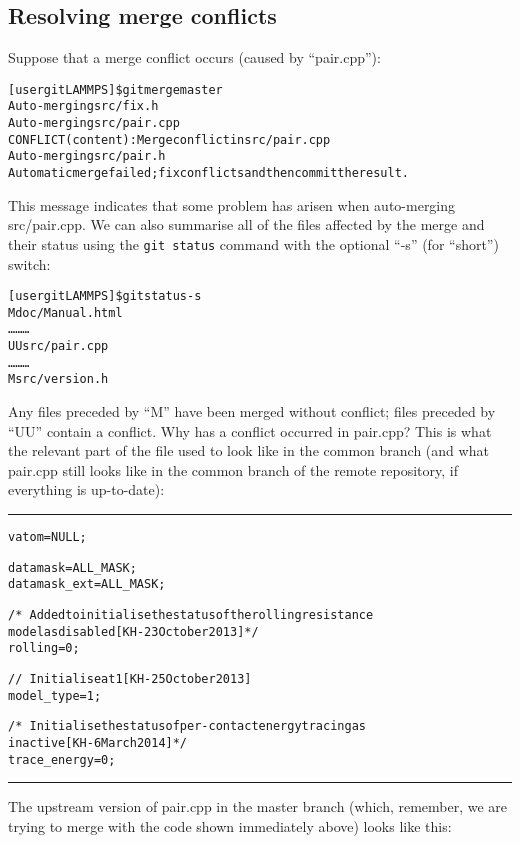 \documentclass[a4paper,oneside,11pt]{article}
\begin{document}
\subsection{Resolving merge conflicts}\label{ssec:rmc}
Suppose that a merge conflict occurs (caused by ``pair.cpp''):
\begin{alltt}
[user gitLAMMPS]\$ git merge master
Auto-merging src/fix.h
Auto-merging src/pair.cpp
CONFLICT (content): Merge conflict in src/pair.cpp
Auto-merging src/pair.h
Automatic merge failed; fix conflicts and then commit the result.
\end{alltt}
This message indicates that some problem has arisen when auto-merging src/pair.cpp. We can also summarise all of the files affected by the merge and their status using the \texttt{git status} command with the optional ``-s'' (for ``short'') switch:
\begin{alltt}
[user gitLAMMPS]\$ git status -s
M  doc/Manual.html
\ldots\hspace*{10em}\ldots\hspace*{10em}\ldots
UU src/pair.cpp
\ldots\hspace*{10em}\ldots\hspace*{10em}\ldots
M  src/version.h
\end{alltt}
Any files preceded by ``M'' have been merged without conflict; files preceded by ``UU'' contain a conflict. Why has a conflict occurred in pair.cpp? This is what the relevant part of the file used to look like in the common branch (and what pair.cpp still looks like in the common branch of the remote repository, if everything is up-to-date):

\noindent\textcolor{customblue}{\rule{8cm}{0.8pt}}
\begin{alltt}
  vatom = NULL;

  datamask = ALL_MASK;
  datamask_ext = ALL_MASK;

  /*~ Added to initialise the status of the rolling resistance
    model as disabled [KH - 23 October 2013]*/
  rolling = 0;

  //~ Initialise at 1 [KH - 25 October 2013]
  model_type = 1;

  /*~ Initialise the status of per-contact energy tracing as
    inactive [KH - 6 March 2014]*/
  trace_energy = 0;
\end{alltt}
\noindent\textcolor{customblue}{\rule{8cm}{0.8pt}}

The upstream version of pair.cpp in the master branch (which, remember, we are trying to merge with the code shown immediately above) looks like this:
\end{document}
